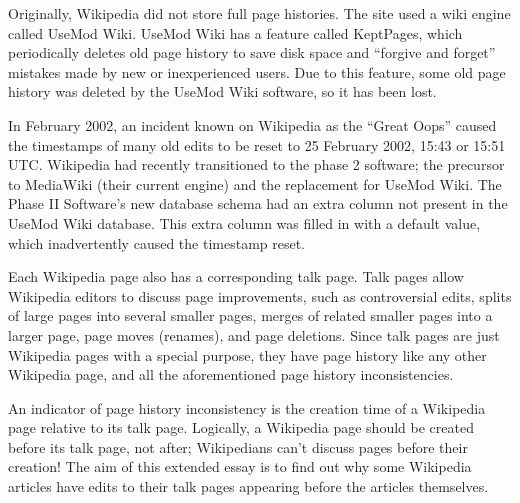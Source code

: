 \documentclass[14pt,a4paper]{report}
\begin{document}
Originally, Wikipedia did not store full page histories. The site used a wiki engine called UseMod Wiki. \autocite{usemod} UseMod Wiki has a feature called KeptPages, which periodically deletes old page history to save disk space and ``forgive and forget'' mistakes made by new or inexperienced users. Due to this feature, some old page history was deleted by the UseMod Wiki software, so it has been lost.

In February 2002, an incident known on Wikipedia as the ``Great Oops''\autocite{oopsydoopsy} caused the timestamps of many old edits to be reset to 25 February 2002, 15:43 or 15:51 UTC. Wikipedia had recently transitioned to the phase 2 software; the precursor to MediaWiki (their current engine) and the replacement for UseMod Wiki. \autocite{phase2} The Phase II Software's new database schema had an extra column not present in the UseMod Wiki database. This extra column was filled in with a default value, which inadvertently caused the timestamp reset. \autocite{oopsexplained}

Each Wikipedia page also has a corresponding talk page. Talk pages allow Wikipedia editors to discuss page improvements, such as controversial edits, splits of large pages into several smaller pages, merges of related smaller pages into a larger page, page moves (renames), and page deletions. \autocite{talkhelp} Since talk pages are just Wikipedia pages with a special purpose, they have page history like any other Wikipedia page, and all the aforementioned page history inconsistencies.

An indicator of page history inconsistency is the creation time of a Wikipedia page relative to its talk page. Logically, a Wikipedia page should be created before its talk page, not after; Wikipedians can't discuss pages before their creation! The aim of this extended essay is to find out why some Wikipedia articles have edits to their talk pages appearing before the articles themselves.
\end{document}
